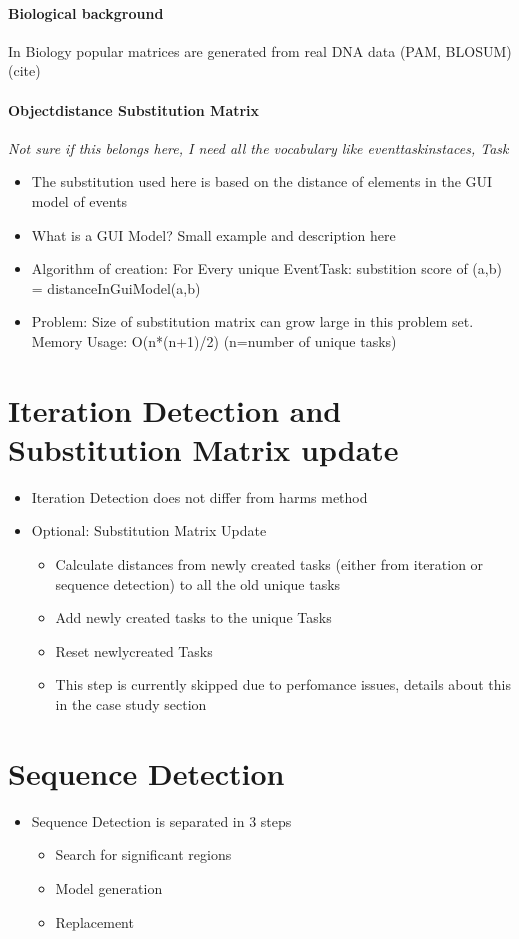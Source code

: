 \begin{itemize}
	\paragraph{Biological background}
	In Biology popular matrices are generated from real DNA data (PAM, BLOSUM) (cite)
	\paragraph{Objectdistance Substitution Matrix}
	\textit{Not sure if this belongs here, I need all the vocabulary  like eventtaskinstaces, Task}
	\begin{itemize}
		\item The substitution used here is based on the distance of elements in the GUI model of events
		\item What is a GUI Model? Small example and description here
		\item Algorithm of creation: For Every unique EventTask: substition score of (a,b) = distanceInGuiModel(a,b) 
		\item Problem: Size of substitution matrix can grow large in this problem set. Memory Usage: O(n*(n+1)/2) (n=number of unique tasks)
	\end{itemize}

\section{Iteration Detection and Substitution Matrix update}
\begin{itemize}
	\item Iteration Detection does not differ from harms method
	\item Optional: Substitution Matrix Update 
	\begin{itemize}
		\item Calculate distances from newly created tasks (either from iteration or sequence detection) to all the old unique tasks
		\item Add newly created tasks to the unique Tasks
		\item Reset newlycreated Tasks
		\item This step is currently skipped due to perfomance issues, details about this in the case study section
	\end{itemize}
\end{itemize}


\section{Sequence Detection}
\begin{itemize}
	\item Sequence Detection is separated in 3 steps
	\begin{itemize}
		\item Search for significant regions
		\item Model generation
		\item Replacement
	\end{itemize}
\end{itemize}

\end{itemize}
